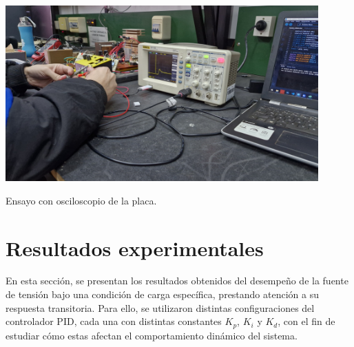 \begin{foto}[H]
    \centering
    \includegraphics[width=0.9\textwidth]{./imagenes/fotos/osciloscopio.jpg}
    \caption{Ensayo con osciloscopio de la placa.}
    \label{F:esayos_y_pruebas}
\end{foto}\par 

\section{Resultados experimentales}
En esta sección, se presentan los resultados obtenidos del desempeño de la fuente de tensión bajo una condición de carga específica, prestando atención a su respuesta transitoria. Para ello, se utilizaron distintas configuraciones del controlador PID, cada una con distintas constantes $K_p$, $K_i$ y $K_d$, con el fin de estudiar cómo estas afectan el comportamiento dinámico del sistema.\par 

